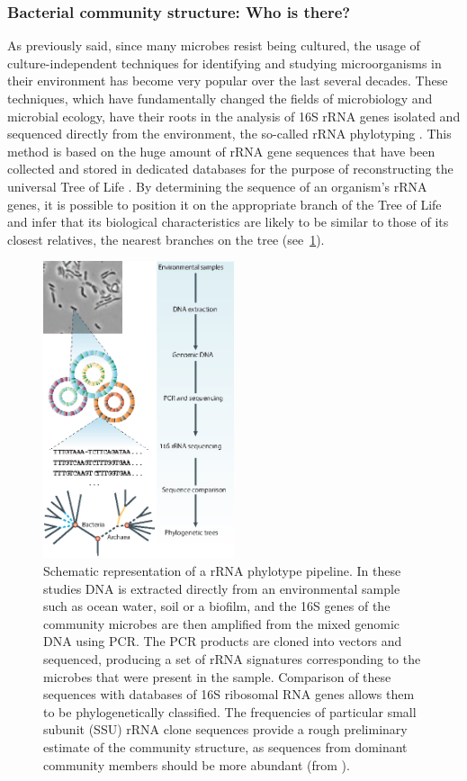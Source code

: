 \subsubsection{Bacterial community structure: Who is there?}
As previously said, since many microbes resist being cultured, the usage of culture-independent techniques for identifying and studying microorganisms in their environment has become very popular over the last several decades. These techniques, which have fundamentally changed the fields of microbiology and microbial ecology, have their roots in the analysis of 16S rRNA genes isolated and sequenced directly from the environment, the so-called rRNA phylotyping \cite{pace1997molecular, olsen1986microbial}. This method is based on the huge amount of rRNA gene sequences that have been collected and stored in dedicated databases for the purpose of reconstructing the universal Tree of Life \cite{brown2002universal}. By determining the sequence of an organism’s rRNA genes, it is possible to position it on the appropriate branch of the Tree of Life and infer that its biological characteristics are likely to be similar to those of its closest relatives, the nearest branches on the tree (see~\ref{fig:rnaphylo}).\\
\begin{figure}[!tb]
	\centering
	\includegraphics[width=0.5\textwidth]{./figures/Introduction/rna_phylotyping}
  	\caption{Schematic representation of a rRNA phylotype pipeline. In these studies DNA is extracted directly from an environmental sample such as ocean water, soil or a biofilm, and the 16S genes of the community microbes are then amplified from the mixed genomic DNA using PCR. The PCR products are cloned into vectors and sequenced, producing a set of rRNA signatures corresponding to the microbes that were present in the sample. Comparison of these sequences with databases of 16S ribosomal RNA genes allows them to be phylogenetically classified. The frequencies of particular small subunit (SSU) rRNA clone sequences provide a rough preliminary estimate of the community structure, as sequences from dominant community members should be more abundant (from \cite{tringe2005metagenomics}).\label{fig:rnaphylo}}
\end{figure}
